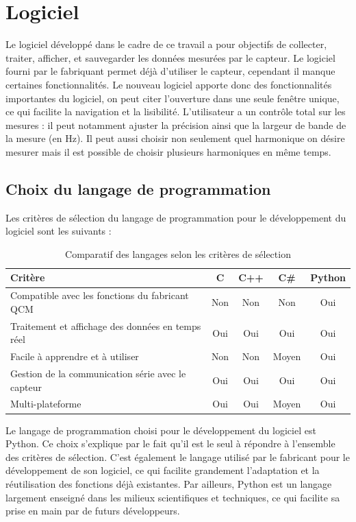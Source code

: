 \chapter{Logiciel}
Le logiciel développé dans le cadre de ce travail a pour objectifs de collecter, traiter, afficher, et sauvegarder les données mesurées par le capteur.
Le logiciel fourni par le fabriquant permet déjà d'utiliser le capteur, cependant il manque certaines fonctionnalités. Le nouveau logiciel apporte donc des fonctionnalités importantes du logiciel, on peut citer l’ouverture dans une seule fenêtre unique, ce qui facilite la navigation et la lisibilité.
L'utilisateur a un contrôle total sur les mesures : il peut notamment ajuster la précision ainsi que la largeur de bande de la mesure (en Hz).
Il peut aussi choisir non seulement quel harmonique on désire mesurer mais il est possible de choisir plusieurs harmoniques en même temps.

\section{Choix du langage de programmation}

Les critères de sélection du langage de programmation pour le développement du logiciel sont les suivants :

\begin{table}[H]
    \centering
    \begin{tabular}{|p{6cm}|c|c|c|c|}
        \hline
        \textbf{Critère} & \textbf{C} & \textbf{C++} & \textbf{C\#} & \textbf{Python} \\
        \hline
        Compatible avec les fonctions du fabricant QCM & Non & Non & Non & Oui \\
        \hline
        Traitement et affichage des données en temps réel & Oui & Oui & Oui & Oui \\
        \hline
        Facile à apprendre et à utiliser & Non & Non & Moyen & Oui \\
        \hline
        Gestion de la communication série avec le capteur & Oui & Oui & Oui & Oui \\
        \hline
        Multi-plateforme & Oui & Oui & Moyen & Oui \\
        \hline
    \end{tabular}
    \caption{Comparatif des langages selon les critères de sélection}
    \label{tab:comparatif_langages}
\end{table}

Le langage de programmation choisi pour le développement du logiciel est Python.  
Ce choix s’explique par le fait qu’il est le seul à répondre à l’ensemble des critères de sélection. C’est également le langage utilisé par le fabricant pour le développement de son logiciel, ce qui facilite grandement l’adaptation et la réutilisation des fonctions déjà existantes.  
Par ailleurs, Python est un langage largement enseigné dans les milieux scientifiques et techniques, ce qui facilite sa prise en main par de futurs développeurs.


